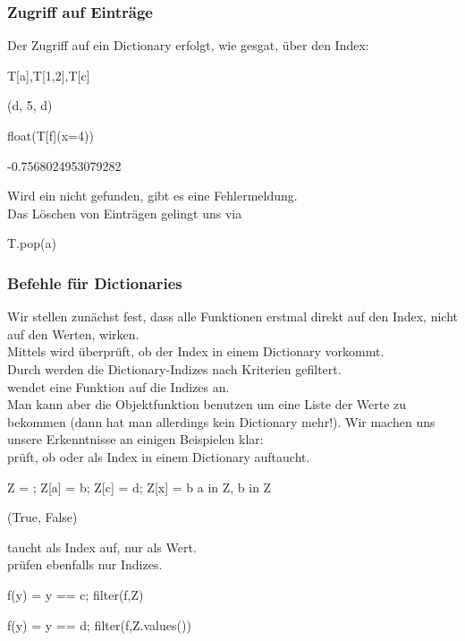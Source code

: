 \documentclass[fontsize=12pt,paper=a4,twoside,bibtotoc,idxtotoc,
liststotoc,pagesize,BCOR1.2cm,DIV15,chapterprefix,pagesize=pdftex]{scrbook}
\theoremstyle{plain}
\theoremstyle{definition}
\theoremstyle{remark}
\begin{document}
\subsubsection{Zugriff auf Einträge}
Der Zugriff auf ein Dictionary erfolgt, wie gesgat, über den Index:
\begin{sagein}
T[a],T[1,2],T[c]
\end{sagein}
\begin{sageout}
(d, 5, d)
\end{sageout}
\begin{sagein}
 float(T[f](x=4))
\end{sagein}
\begin{sageout}
 -0.7568024953079282
\end{sageout}
Wird ein  nicht gefunden, gibt es eine Fehlermeldung.\\
Das Löschen von Einträgen gelingt uns via 
\begin{sagein}
T.pop(a)
\end{sagein}
\subsubsection{Befehle für Dictionaries}
Wir stellen zunächst fest, dass alle Funktionen erstmal direkt auf den Index, nicht auf den Werten, wirken.\\
Mittels  wird überprüft, ob der Index  in einem Dictionary vorkommt.\\ 
Durch  werden die Dictionary-Indizes nach Kriterien gefiltert.\\
 wendet eine Funktion auf die Indizes an.\\
Man kann aber die Objektfunktion  benutzen um eine Liste der Werte zu bekommen (dann hat man allerdings kein Dictionary mehr!).
Wir machen uns unsere Erkenntnisse an einigen Beispielen klar:\\
 prüft, ob  oder  als Index in einem Dictionary auftaucht.
\begin{sagein}
Z = {}; Z[a] = b; Z[c] = d; Z[x] = b
a in Z, b in Z
\end{sagein}
\begin{sageout}
(True, False)
\end{sageout}
 taucht als Index auf,  nur als Wert.\\
 prüfen ebenfalls nur Indizes.
\begin{sagein}
f(y) = y == c; filter(f,Z)
\end{sagein}
\begin{sageout}
[c]
\end{sageout}
\begin{sagein}
f(y) = y == d; filter(f,Z.values())
\end{sagein}
\begin{sageout}
[d]
\end{sageout}
\end{document}
